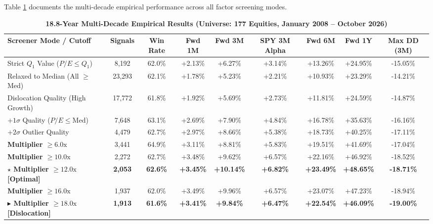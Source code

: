 \documentclass[11pt]{article}
\begin{document}
Table \ref{tab:backtest_comparison} documents the multi-decade empirical performance across all factor screening modes.

\begin{table}[htbp]
\centering
\footnotesize
\setlength{\tabcolsep}{3.0pt}
\caption{\textbf{18.8-Year Multi-Decade Empirical Results (Universe: 177 Equities, January 2008 -- October 2026)}}
\label{tab:backtest_comparison}
\begin{tabular*}{\textwidth}{@{\extracolsep{\fill}}l c c c c c c c c@{}}
\toprule
\textbf{Screener Mode / Cutoff} & \textbf{Signals} & \textbf{Win Rate} & \textbf{Fwd 1M} & \textbf{Fwd 3M} & \textbf{SPY 3M Alpha} & \textbf{Fwd 6M} & \textbf{Fwd 1Y} & \textbf{Max DD (3M)} \\
\midrule
Strict $Q_1$ Value ($P/E \le Q_1$) & 8,192 & 62.0\% & +2.13\% & +6.27\% & +3.14\% & +13.26\% & +24.95\% & -15.05\% \\
Relaxed to Median (All $\ge$ Med) & 23,293 & 62.1\% & +1.78\% & +5.23\% & +2.21\% & +10.93\% & +23.29\% & -14.21\% \\
Dislocation Quality (High Growth) & 17,772 & 61.8\% & +1.92\% & +5.69\% & +2.73\% & +11.81\% & +24.59\% & -14.87\% \\
$+1\sigma$ Quality ($P/E \le \text{Med}$) & 7,648 & 63.1\% & +2.69\% & +7.90\% & +4.84\% & +16.78\% & +35.63\% & -16.16\% \\
$+2\sigma$ Outlier Quality & 4,479 & 62.7\% & +2.97\% & +8.66\% & +5.38\% & +18.73\% & +40.25\% & -17.11\% \\
\midrule
\textbf{Multiplier $\ge 6.0\text{x}$} & 3,441 & 64.9\% & +3.11\% & +8.81\% & +5.83\% & +19.51\% & +41.69\% & -17.04\% \\
\textbf{Multiplier $\ge 10.0\text{x}$} & 2,272 & 62.7\% & +3.48\% & +9.62\% & +6.57\% & +22.16\% & +46.92\% & -18.52\% \\
\textbf{$\star$ Multiplier $\ge 12.0\text{x}$ [Optimal]} & \textbf{2,053} & \textbf{62.6\%} & \textbf{+3.45\%} & \textbf{+10.14\%} & \textbf{+6.82\%} & \textbf{+23.49\%} & \textbf{+48.65\%} & \textbf{-18.71\%} \\
\textbf{Multiplier $\ge 16.0\text{x}$} & 1,937 & 62.0\% & +3.49\% & +9.96\% & +6.57\% & +23.07\% & +47.23\% & -18.94\% \\
\textbf{$\blacktriangleright$ Multiplier $\ge 18.0\text{x}$ [Dislocation]} & \textbf{1,913} & \textbf{61.6\%} & \textbf{+3.41\%} & \textbf{+9.84\%} & \textbf{+6.47\%} & \textbf{+22.54\%} & \textbf{+46.09\%} & \textbf{-19.00\%} \\
\bottomrule
\end{tabular*}
\end{table}
\end{document}
